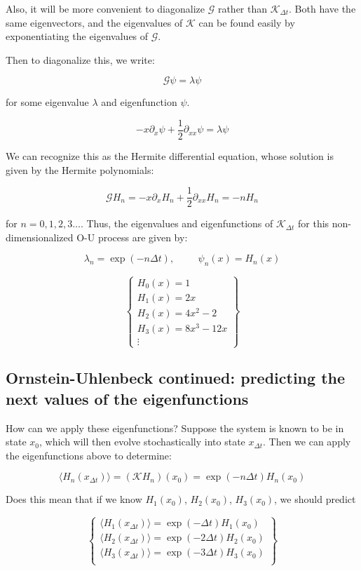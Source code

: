 \documentclass[]{article}
\newcommand{\p}[1]{\left( #1 \right)}
\newcommand{\Kp}{\mathcal{K}}
\begin{document}
Also, it will be more convenient to diagonalize $\mathcal{G}$ rather than $\Kp_{\Delta t}$. Both have the same eigenvectors, and the eigenvalues of $\Kp$ can be found easily by exponentiating the eigenvalues of $\mathcal{G}$.

Then to diagonalize this, we write:

$$
\mathcal{G} \psi = \lambda \psi
$$

for some eigenvalue $\lambda$ and eigenfunction $\psi$.

$$
- x\partial_x \psi + \frac{1}{2}\partial_{xx}\psi = \lambda \psi
$$

We can recognize this as the Hermite differential equation, whose solution is given by the Hermite polynomials:

$$
\mathcal{G} H_n = - x\partial_x H_n + \frac{1}{2}\partial_{xx} H_n = -nH_n
$$

for $n=0,1,2,3\dots$. Thus, the eigenvalues and eigenfunctions of $\Kp_{\Delta t}$ for this non-dimensionalized O-U process are given by:

$$
\lambda_n = \exp(-n\Delta t),\hspace{1cm} \psi_n(x) = H_n(x)
$$

$$
\begin{Bmatrix}
	H_0(x) = 1 \\
	H_1(x) = 2x \\
	H_2(x) = 4x^2 - 2\\
	H_3(x) = 8x^3 - 12x \\
	\vdots
\end{Bmatrix}
$$

\subsection{Ornstein-Uhlenbeck continued: predicting the next values of the eigenfunctions}

How can we apply these eigenfunctions? Suppose the system is known to be in state $x_0$, which will then evolve stochastically into state $x_{\Delta t}$. Then we can apply the eigenfunctions above to determine:

$$
\langle H_n(x_{\Delta t}) \rangle = \p{\Kp H_n}(x_0) = \exp(-n\Delta t) H_n(x_0)
$$

Does this mean that if we know $H_1(x_0)$, $H_2(x_0)$, $H_3(x_0)$, we should predict

$$
\begin{Bmatrix}
	\langle H_1(x_{\Delta t}) \rangle = \exp(-\Delta t) H_1(x_0) \\
	\langle H_2(x_{\Delta t}) \rangle = \exp(-2\Delta t) H_2(x_0) \\
	\langle H_3(x_{\Delta t}) \rangle = \exp(-3\Delta t) H_3(x_0) \\
\end{Bmatrix}
$$
\end{document}

